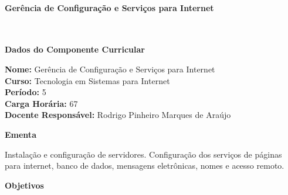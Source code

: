 \paragraph{Gerência de Configuração e Serviços para Internet} \


\begin{snugshade}\begin{center}\textbf{
    Dados do Componente Curricular
}\end{center}\end{snugshade}

\noindent \textbf{Nome:}                Gerência de Configuração e Serviços para Internet
\\        \textbf{Curso:}               Tecnologia em Sistemas para Internet
\\        \textbf{Período:}             \unit{5}{\degree}
\\        \textbf{Carga Horária:}       \unit{67}{\hour}
\\        \textbf{Docente Responsável:} Rodrigo Pinheiro Marques de Araújo


\begin{snugshade}\begin{center}\textbf{
    Ementa
\vphantom{q}}\end{center}\end{snugshade}

\noindent
Instalação e configuração de servidores. Configuração dos serviços de páginas para internet, banco de dados, mensagens eletrônicas, nomes e acesso remoto.


\begin{snugshade}\begin{center}\textbf{
    Objetivos
}\end{center}\end{snugshade}

